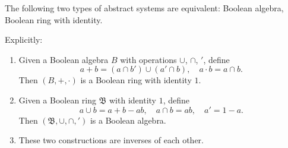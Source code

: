 The following two types of abstract systems are equivalent: Boolean algebra, Boolean ring with identity.

Explicitly:
\begin{enumerate}
\item Given a Boolean algebra $B$ with operations $\cup$, $\cap$, $'$, define
$$a + b = (a \cap b') \cup (a' \cap b), \quad a \cdot b = a \cap b.$$
Then $(B, +, \cdot)$ is a Boolean ring with identity $1$.

\item Given a Boolean ring $\mathfrak{B}$ with identity $1$, define
$$a \cup b = a + b - ab, \quad a \cap b = ab, \quad a' = 1 - a.$$
Then $(\mathfrak{B}, \cup, \cap, ')$ is a Boolean algebra.

\item These two constructions are inverses of each other.
\end{enumerate}
